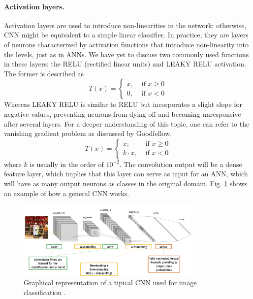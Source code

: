 \paragraph{Activation layers.} Activation layers are used to introduce non-linearities in the network; otherwise, CNN might be equivalent to a simple linear classifier. In practice, they are layers of neurons characterized by activation functions that introduce non-linearity into the levels, just as in ANNs. We have yet to discuss two commonly used functions in these layers: the RELU (rectified linear units) and LEAKY RELU activation. The former is described as
\begin{equation}
    \label{eq:RELU}
    T(x)=\left\{\begin{array}{rr}
    x, & \text { if } x \geq 0 \\
    0, & \text { if } x<0
\end{array}\right.
\end{equation}
Whereas LEAKY RELU is similar to RELU but incorporates a slight slope for negative values, preventing neurons from dying off and becoming unresponsive after several layers. For a deeper understanding of this topic, one can refer to the vanishing gradient problem as discussed by Goodfellow.
\begin{equation}
    \label{eq:LEAKYRELU}
    T(x)=\left\{\begin{array}{rr}
    x, & \text { if } x \geq 0 \\
    k\cdot x, & \text { if } x<0
\end{array}\right.
\end{equation}
where $k$ is usually in the order of $10^{-2}$.
The convolution output will be a dense feature layer, which implies that this layer can serve as input for an ANN, which will have as many output neurons as classes in the original domain. Fig. \ref{fig:typicalcnn} shows an example of how a general CNN works.
\begin{figure}
    \centering
    \includegraphics[width=0.8\textwidth]{Images/CNNtypical.png}
    \caption[CNN general structure.]{Graphical representation of a tipical CNN used for image classification \cite{giacomo_boracchi_convolutional_2021}.}
    \label{fig:typicalcnn}
\end{figure}


